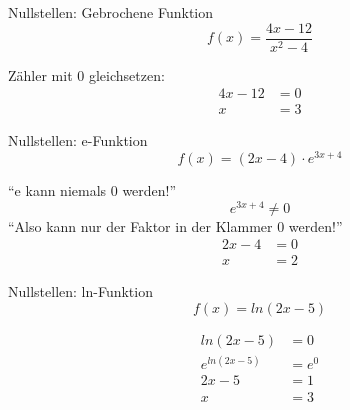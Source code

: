\documentclass[paper=a6,landscape,ngerman,twoside=true,fontsize=12pt]{scrartcl}
\begin{document}
\begin{frage}
	Nullstellen: Gebrochene Funktion
	\[
	f(x)=\frac{4x-12}{x^2-4}
	\]
\end{frage}
\begin{antwort}
	Zähler mit 0 gleichsetzen:
	\begin{align*}
	4x-12&=0 \\
	x&=3
	\end{align*}
\end{antwort}
\begin{frage}
	Nullstellen: e-Funktion
	\[
	f(x)=(2x-4)\cdot{e^{3x+4}}
	\]
\end{frage}
\begin{antwort}
	"`e kann niemals 0 werden!"'
	\[
	{e^{3x+4}}\neq0
	\]
	"`Also kann nur der Faktor in der Klammer 0 werden!"'
	\begin{align*}
	2x-4&=0 \\
	x&=2
	\end{align*}
\end{antwort}
\begin{frage}
	Nullstellen: ln-Funktion
	\[
	f(x)=ln(2x-5)
	\]
\end{frage}
\begin{antwort}
	\begin{align*}
		ln(2x-5)&=0\\
		{e^{ln(2x-5)}}&=e^0\\
		2x-5&=1\\
		x&=3
	\end{align*}

\end{antwort}
\end{document}
